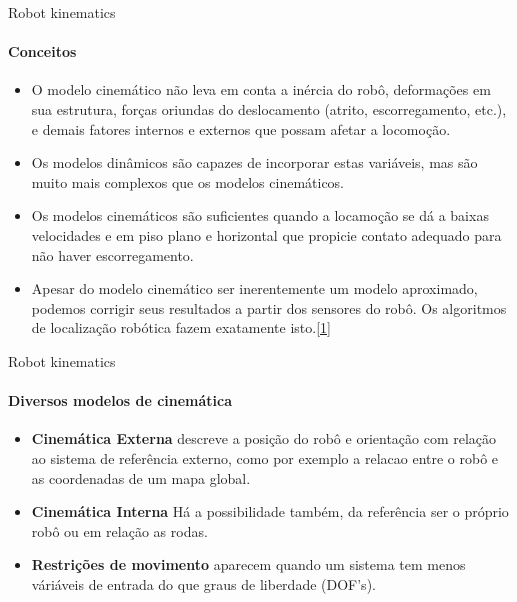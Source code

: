 \documentclass[aspectratio=169]{beamer}
\begin{document}
\begin{frame}{Robot kinematics}
    \framesubtitle{Conceitos}
    \begin{itemize}
        \item O modelo cinemático não leva em conta a inércia do robô, deformações em
              sua estrutura, forças oriundas do deslocamento (atrito, escorregamento, etc.),
              e demais fatores internos e externos que possam afetar a locomoção.
        \item Os modelos dinâmicos são capazes de incorporar estas variáveis, mas são
              muito mais complexos que os modelos cinemáticos.
        \item Os modelos cinemáticos são suficientes quando a locamoção se dá a baixas
              velocidades e em piso plano e horizontal que propicie contato adequado para
              não haver escorregamento.
        \item Apesar do modelo cinemático ser inerentemente um modelo aproximado,
              podemos corrigir seus resultados a partir dos sensores do robô. Os algoritmos
              de localização robótica fazem exatamente isto.\href{http://143.106.148.168:9080/Cursos/IA368N/01-16/cinematica2.pdf}{[1]}
    \end{itemize}
\end{frame}

\begin{frame}{Robot kinematics}
    \framesubtitle{Diversos modelos de cinemática}
    \begin{itemize}
        \item \textbf{Cinemática Externa} descreve a posição do robô e orientação com relação ao sistema de referência externo, como por exemplo a relacao entre o robô e as coordenadas de um mapa global.
        \item \textbf{Cinemática Interna} Há a possibilidade também, da referência ser o próprio robô ou em relação as rodas.
        \item \textbf{Restrições de movimento} aparecem quando um sistema tem menos váriáveis de entrada do que graus de liberdade (DOF's).
    \end{itemize}
\end{frame}
\end{document}

